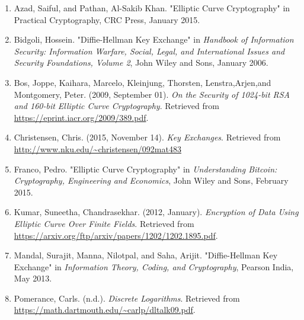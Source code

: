 \begin{enumerate}[(1)]

\item
Azad, Saiful, and Pathan, Al-Sakib Khan. "Elliptic Curve Cryptography" in Practical Cryptography, CRC Press, January 2015.

\item 
Bidgoli, Hossein. "Diffie-Hellman Key Exchange" in \emph{Handbook of Information \newline
Security: Information Warfare, Social, Legal, and International Issues and \newline
Security Foundations, Volume 2}, John Wiley and Sons, January 2006.

\item 
Bos, Joppe, Kaihara, Marcelo, Kleinjung, Thorsten, Lenstra,Arjen,and Montgomery, Peter. (2009, September 01). \emph{On the Security of 1024-bit RSA and 160-bit Elliptic Curve Cryptography}. Retrieved from \url{https://eprint.iacr.org/2009/389.pdf}.

\item 
Christensen, Chris. (2015, November 14). \emph{Key Exchanges}. Retrieved from \url{http://www.nku.edu/~christensen/092mat483}

\item
Franco, Pedro. "Elliptic Curve Cryptography" in \emph{Understanding Bitcoin: Cryptography, Engineering and Economics}, John Wiley and Sons, February 2015.

\item 
Kumar, Suneetha, Chandrasekhar. (2012, January). \emph{Encryption of Data  Using \newline
Elliptic Curve Over Finite Fields}. Retrieved from \newline 
\url{https://arxiv.org/ftp/arxiv/papers/1202/1202.1895.pdf}.

\item 
Mandal, Surajit, Manna, Nilotpal, and Saha, Arijit. "Diffie-Hellman \newline
Key Exchange" in \emph{Information Theory, Coding, and Cryptography}, Pearson India, May 2013.

\item 
Pomerance, Carls. (n.d.). \emph{Discrete Logarithms}. Retrieved from \url{https://math.dartmouth.edu/~carlp/dltalk09.pdf}.




\end{enumerate}